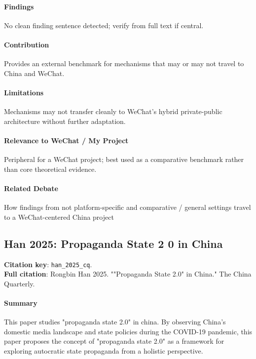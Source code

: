 \documentclass[12pt]{article}
\begin{document}
\paragraph{Findings} No clean finding sentence detected; verify from full text if central.

\paragraph{Contribution} Provides an external benchmark for mechanisms that may or may not travel to China and WeChat.

\paragraph{Limitations} Mechanisms may not transfer cleanly to WeChat's hybrid private-public architecture without further adaptation.

\paragraph{Relevance to WeChat / My Project} Peripheral for a WeChat project; best used as a comparative benchmark rather than core theoretical evidence.

\paragraph{Related Debate} How findings from not platform-specific and comparative / general settings travel to a WeChat-centered China project


\subsection{Han 2025: Propaganda State 2 0 in China}
\textbf{Citation key}: \texttt{han\_2025\_cq}.\\
\textbf{Full citation}: Rongbin Han 2025. ""Propaganda State 2.0" in China." The China Quarterly.

\paragraph{Summary} This paper studies "propaganda state 2.0" in china. By observing China's domestic media landscape and state policies during the COVID-19 pandemic, this paper proposes the concept of "propaganda state 2.0" as a framework for exploring autocratic state propaganda from a holistic perspective.
\end{document}
